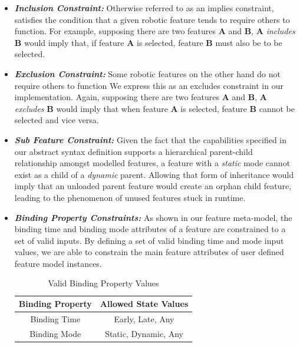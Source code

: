 \documentclass[conference]{IEEEtran}
\begin{document}
\begin{itemize}
    \item \textit{\textbf{Inclusion Constraint:}}
    Otherwise referred to as an implies constraint, satisfies the condition that a given robotic feature tends to require others to function. For example, supposing there are two features \textbf{A} and \textbf{B}, \textbf{A} \textit{includes} \textbf{B} would imply that, if feature \textbf{A} is selected, feature \textbf{B} must also be to be selected.
    
    \item \textit{\textbf{Exclusion Constraint:}}
    Some robotic features on the other hand do not require others to function We express this as an excludes constraint in our implementation. Again, supposing there are two features \textbf{A} and \textbf{B}, \textbf{A} \textit{excludes} \textbf{B} would imply that when feature \textbf{A} is selected, feature \textbf{B} cannot be selected and vice versa.
    
    
    \item \textit{\textbf{Sub Feature Constraint:}}
    Given the fact that the capabilities specified in our abstract syntax definition supports a hierarchical parent-child relationship amongst modelled features, a feature with a \textit{static} mode cannot exist as a child of a \textit{dynamic} parent. Allowing that form of inheritance would imply that an unloaded parent feature would create an orphan child feature, leading to the phenomenon of unused features stuck in runtime. 
    

\item \textit{\textbf{Binding Property Constraints:}}
As shown in our feature meta-model, the binding time and binding mode attributes of a feature are constrained to a set of valid inputs. By defining a set of valid binding time and mode input values, we are able to constrain the main feature attributes of user defined feature model instances.

\begin{table}[htbp]
\caption{Valid Binding Property Values}
\begin{center}
\begin{tabular}{|c|c|}
\hline
    Binding Property & Allowed State Values  \\ \hline
    Binding Time & Early, Late, Any \\ \hline
    Binding Mode & Static, Dynamic, Any\\ \hline
\end{tabular}
\label{tab:bpropcon}
\end{center}
\end{table}


\end{itemize}
\end{document}
